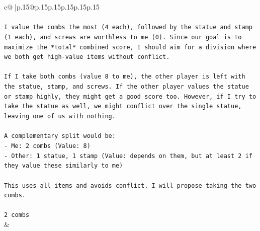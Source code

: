 \documentclass{article}
\begin{document}
{\begin{supertabular}{c@{$\;$}|p{.15\linewidth}@{}p{.15\linewidth}p{.15\linewidth}p{.15\linewidth}p{.15\linewidth}p{.15\linewidth}}
{{{\\ 
\\ 
\texttt{I value the combs the most (4 each), followed by the statue and stamp (1 each), and screws are worthless to me (0). Since our goal is to maximize the *total* combined score, I should aim for a division where we both get high{-}value items without conflict.} \\
\\ 
\texttt{If I take both combs (value 8 to me), the other player is left with the statue, stamp, and screws. If the other player values the statue or stamp highly, they might get a good score too. However, if I try to take the statue as well, we might conflict over the single statue, leaving one of us with nothing.} \\
\\ 
\texttt{A complementary split would be:} \\
\texttt{{-} Me: 2 combs (Value: 8)} \\
\texttt{{-} Other: 1 statue, 1 stamp (Value: depends on them, but at least 2 if they value these similarly to me)} \\
\\ 
\texttt{This uses all items and avoids conflict. I will propose taking the two combs.} \\
\\ 
\texttt{2 combs} \\
            }
        }
    }
    & \\ \\


\end{supertabular}}
\end{document}
